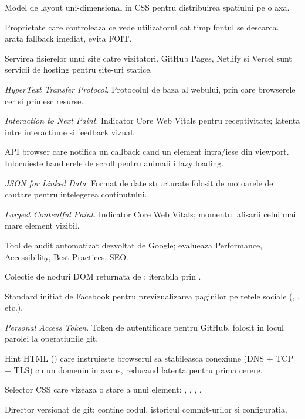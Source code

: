 \begin{description}[font=\sffamily\bfseries\color{partcolor}, leftmargin=0pt, labelindent=0pt, style=nextline, itemsep=4pt]
  \item[Flexbox] Model de layout uni-dimensional in CSS pentru distribuirea spatiului pe o axa.
  \item[Font-display] Proprietate  care controleaza ce vede utilizatorul cat timp fontul se descarca.  = arata fallback imediat, evita FOIT.
  \item[Hosting] Servirea fisierelor unui site catre vizitatori. GitHub Pages, Netlify si Vercel sunt servicii de hosting pentru site-uri statice.
  \item[HTTP] \emph{HyperText Transfer Protocol}. Protocolul de baza al webului, prin care browserele cer si primesc resurse.
  \item[INP] \emph{Interaction to Next Paint}. Indicator Core Web Vitals pentru receptivitate; latenta intre interactiune si feedback vizual.
  \item[IntersectionObserver] API browser care notifica un callback cand un element intra/iese din viewport. Inlocuieste handlerele de scroll pentru animaii i lazy loading.
  \item[JSON-LD] \emph{JSON for Linked Data}. Format de date structurate folosit de motoarele de cautare pentru intelegerea continutului.
  \item[LCP] \emph{Largest Contentful Paint}. Indicator Core Web Vitals; momentul afisarii celui mai mare element vizibil.
  \item[Lighthouse] Tool de audit automatizat dezvoltat de Google; evalueaza Performance, Accessibility, Best Practices, SEO.
  \item[NodeList] Colectie de noduri DOM returnata de ; iterabila prin .
  \item[Open Graph (OGP)] Standard initiat de Facebook pentru previzualizarea paginilor pe retele sociale (, , etc.).
  \item[PAT] \emph{Personal Access Token}. Token de autentificare pentru GitHub, folosit in locul parolei la operatiunile git.
  \item[Preconnect] Hint HTML () care instruieste browserul sa stabileasca conexiune (DNS + TCP + TLS) cu un domeniu in avans, reducand latenta pentru prima cerere.
  \item[Pseudo-clasa] Selector CSS care vizeaza o stare a unui element: , , , .
  \item[Repository (repo)] Director versionat de git; contine codul, istoricul commit-urilor si configuratia.

\end{description}
